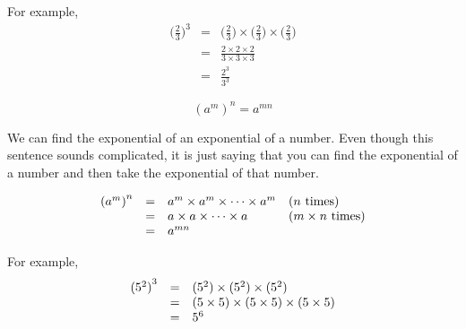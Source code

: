 For example,
\begin{eqnarray*}
\Big(\frac{2}{3}\Big)^3 & = & \Big(\frac{2}{3}\Big) \times  \Big(\frac{2}{3}\Big) \times \Big(\frac{2}{3}\Big) \\
                        & = & \frac{2 \times 2 \times 2}{3 \times 3 \times 3} \\
		        & = & \frac{2^3}{3^3}
\end{eqnarray*}

\Identity
{
$$ {({a}^{m})}^{n}={a}^{mn} $$

We can find the exponential of an exponential of a number. Even though this sentence sounds complicated, it is just saying that you can find the exponential of a number and then take the exponential of that number. \par


\begin{equation*}
    \begin{array}{ccll}\hfill {({a}^{m})}^{n}& =& {a}^{m}  \times {a}^{m}  \times \cdots  \times {a}^{m}\hfill & (\mbox{$n$ times})\hfill \\
	\hfill & =& a  \times a  \times \cdots  \times a\hfill & ({m}  \times \mbox{$n$ times})\hfill \\
	\hfill & =& {a}^{mn}\hfill & 
    \end{array}
\end{equation*}

}
For example,
\begin{equation*}
    \begin{array}{ccl}\hfill {({5}^{2})}^{3}& =& ({5}^{2})  \times ({5}^{2})  \times ({5}^{2})\hfill \\ 
	      & =& (5  \times 5)  \times (5  \times 5)  \times (5  \times 5)\hfill \\
	      & =& 5^6\hfill
    \end{array}
\end{equation*}



